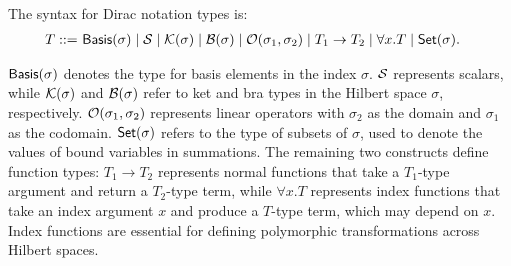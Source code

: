 \begin{definition}
    The syntax for Dirac notation types is:
    \begin{align*}
        T ::=\ & \mathsf{Basis}(\sigma) \mid \mathcal{S} \mid \mathcal{K}(\sigma) \mid \mathcal{B}(\sigma) \mid \mathcal{O}(\sigma_1, \sigma_2) \mid T_1 \to T_2 \mid \forall x.T \mid \mathsf{Set}(\sigma).
    \end{align*}
\end{definition}
\( \mathsf{Basis}(\sigma) \) denotes the type for basis elements in the index \( \sigma \).
\( \mathcal{S} \) represents scalars, while \( \mathcal{K}(\sigma) \) and \( \mathcal{B}(\sigma) \) refer to ket and bra types in the Hilbert space \( \sigma \), respectively.
\( \mathcal{O}(\sigma_1, \sigma_2) \) represents linear operators with \( \sigma_2 \) as the domain and \( \sigma_1 \) as the codomain.
\( \mathsf{Set}(\sigma) \) refers to the type of subsets of \( \sigma \), used to denote the values of bound variables in summations.
The remaining two constructs define function types: \( T_1 \to T_2 \) represents normal functions that take a \( T_1 \)-type argument and return a \( T_2 \)-type term, while \( \forall x. T \) represents index functions that take an index argument \( x \) and produce a \( T \)-type term, which may depend on \( x \).
Index functions are essential for defining polymorphic transformations across Hilbert spaces.


